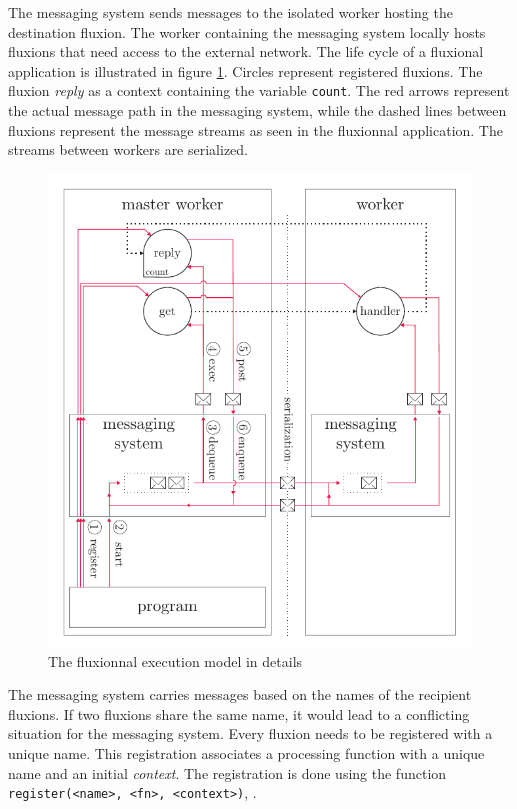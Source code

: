 The messaging system sends messages to the isolated worker hosting the destination fluxion.
The worker containing the messaging system locally hosts fluxions that need access to the external network.
The life cycle of a fluxional application is illustrated in figure \ref{fig:MesSys}.
Circles represent registered fluxions.
The fluxion \textit{reply} as a context containing the variable \texttt{count}.
The red arrows represent the actual message path in the messaging system, while the dashed lines between fluxions represent the message streams as seen in the fluxionnal application.
The streams between workers are serialized.

\begin{figure}[h!]
  \includegraphics[width=\linewidth]{ressources/schema-message.pdf}
  \caption{The fluxionnal execution model in details}
  \label{fig:MesSys}
\end{figure}

The messaging system carries messages based on the names of the recipient fluxions.
If two fluxions share the same name, it would lead to a conflicting situation for the messaging system.
Every fluxion needs to be registered with a unique name.
This registration associates a processing function with a unique name and an initial \textit{context}.
The registration is done using the function \texttt{register(<name>, <fn>, <context>)}, .

